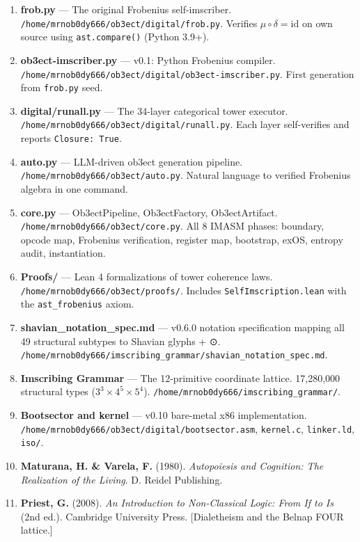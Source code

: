 \documentclass[12pt,a4paper]{article}
\begin{document}
\begin{enumerate}
    \item \textbf{frob.py} --- The original Frobenius self-imscriber. \texttt{/home/mrnob0dy666/ob3ect/digital/frob.py}. Verifies $\mu\circ\delta = \mathrm{id}$ on own source using \texttt{ast.compare()} (Python 3.9+).
    \item \textbf{ob3ect-imscriber.py} --- v0.1: Python Frobenius compiler. \texttt{/home/mrnob0dy666/ob3ect/digital/ob3ect-imscriber.py}. First generation from \texttt{frob.py} seed.
    \item \textbf{digital/runall.py} --- The 34-layer categorical tower executor. \texttt{/home/mrnob0dy666/ob3ect/digital/runall.py}. Each layer self-verifies and reports \texttt{Closure: True}.
    \item \textbf{auto.py} --- LLM-driven ob3ect generation pipeline. \texttt{/home/mrnob0dy666/ob3ect/auto.py}. Natural language to verified Frobenius algebra in one command.
    \item \textbf{core.py} --- Ob3ectPipeline, Ob3ectFactory, Ob3ectArtifact. \texttt{/home/mrnob0dy666/ob3ect/core.py}. All 8 IMASM phases: boundary, opcode map, Frobenius verification, register map, bootstrap, exOS, entropy audit, instantiation.
    \item \textbf{Proofs/} --- Lean 4 formalizations of tower coherence laws. \texttt{/home/mrnob0dy666/ob3ect/proofs/}. Includes \texttt{SelfImscription.lean} with the \texttt{ast\_frobenius} axiom.
    \item \textbf{shavian\_notation\_spec.md} --- v0.6.0 notation specification mapping all 49 structural subtypes to Shavian glyphs + ⊙. \texttt{/home/mrnob0dy666/imscribing\_grammar/shavian\_notation\_spec.md}.
    \item \textbf{Imscribing Grammar} --- The 12-primitive coordinate lattice. 17,280,000 structural types ($3^3 \times 4^5 \times 5^4$). \texttt{/home/mrnob0dy666/imscribing\_grammar/}.
    \item \textbf{Bootsector and kernel} --- v0.10 bare-metal x86 implementation. \texttt{/home/mrnob0dy666/ob3ect/digital/bootsector.asm}, \texttt{kernel.c}, \texttt{linker.ld}, \texttt{iso/}.
    \item \textbf{Maturana, H. \& Varela, F.} (1980). \emph{Autopoiesis and Cognition: The Realization of the Living}. D. Reidel Publishing.
    \item \textbf{Priest, G.} (2008). \emph{An Introduction to Non-Classical Logic: From If to Is} (2nd ed.). Cambridge University Press. {[}Dialetheism and the Belnap FOUR lattice.{]}
\end{enumerate}
\end{document}
